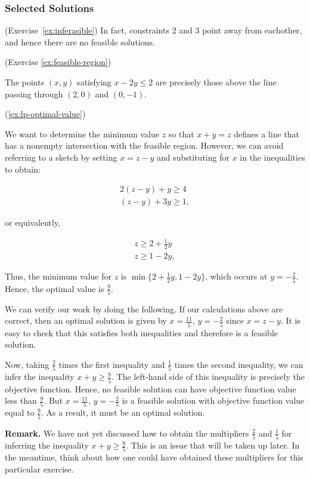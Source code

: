 \subsubsection*{Selected Solutions}
\label{solutions}

\begin{solution}(Exercise~\ref{ex:inferasible})
In fact, constraints 2 and 3 point away from eachother, and hence there are no feasible solutions.  
\end{solution}


\begin{solution}(Exercise \ref{ex:feasible-region})

The points \((x,y)\) satisfying \(x-2y \leq 2\) are precisely those
above the line passing through \((2,0)\) and \((0,-1)\).
\end{solution}

\begin{solution}(\ref{ex:lp-optimal-value})

We want to determine the minimum value \(z\) so that \(x+y=z\) defines
a line that has a nonempty intersection with the feasible region.
However, we can avoid referring to a sketch by setting \(x=z-y\) and
substituting for \(x\) in the inequalities to obtain:

\begin{eqnarray*}
2(z-y) + y \geq 4 \\
(z-y) + 3y \geq 1,
\end{eqnarray*}

or equivalently,

\begin{eqnarray*}
z \geq 2+\frac{1}{2}y \\
z \geq 1-2y,
\end{eqnarray*}

Thus, the minimum value for \(z\) is
\(\min \{ 2+\frac{1}{2}y, 1-2y\}\), which occurs at
\(y = -\frac{2}{5}\). Hence, the optimal value is \(\frac{9}{5}\).

We can verify our work by doing the following. If our calculations
above are correct, then an optimal solution is given by
\(x = \frac{11}{5}\), \(y = -\frac{2}{5}\) since \(x = z - y\). It is
easy to check that this satisfies both inequalities and therefore is a
feasible solution.

Now, taking \(\frac{2}{5}\) times the first inequality and
\(\frac{1}{5}\) times the second inequality, we can infer the
inequality \(x+y \geq \frac{9}{5}\). The left-hand side of this
inequality is precisely the objective function. Hence, no feasible
solution can have objective function value less than \(\frac{9}{5}\).
But \(x = \frac{11}{5}\), \(y = -\frac{2}{5}\) is a feasible solution
with objective function value equal to \(\frac{9}{5}\). As a result,
it must be an optimal solution.

\textbf{Remark.} We have not yet discussed how to obtain the
multipliers \(\frac{2}{5}\) and \(\frac{1}{5}\) for inferring the
inequality \(x+y \geq \frac{9}{5}\). This is an issue that will be
taken up later. In the meantime, think about how one could have
obtained these multipliers for this particular exercise.
\end{solution}

